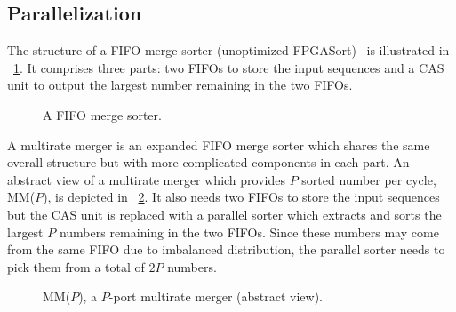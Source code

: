 \documentclass[10pt, conference]{IEEEtran}
\begin{document}
\subsection{Parallelization}

The structure of a FIFO merge sorter (unoptimized FPGASort)~\cite{Marcelino2008, Koch2011} is illustrated in \figurename~\ref{fig_fifomerge}.
It comprises three parts: two FIFOs to store the input sequences
and a CAS unit to output the largest number remaining in the two FIFOs.

\begin{figure}[bt]
\caption{A FIFO merge sorter.}\label{fig_fifomerge}
\end{figure}

A multirate merger is an expanded FIFO merge sorter which shares the same overall structure but with more complicated components in each part.
An abstract view of a multirate merger which provides $P$ sorted number per cycle, MM($P$), is depicted in \figurename~\ref{fig_pmerger_concept}.
It also needs two FIFOs to store the input sequences but the CAS unit is replaced with a parallel sorter
which extracts and sorts the largest $P$ numbers remaining in the two FIFOs.
Since these numbers may come from the same FIFO due to imbalanced distribution,
the parallel sorter needs to pick them from a total of $2P$ numbers.

\begin{figure}[bt]
\caption{MM($P$), a $P$-port multirate merger (abstract view).}\label{fig_pmerger_concept}
\end{figure}
\end{document}
